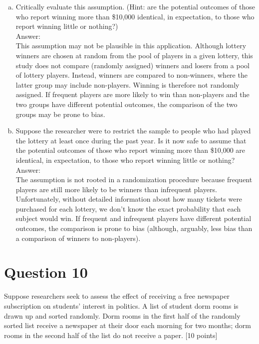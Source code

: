 \documentclass[11pt,notitlepage]{article}		%
\begin{document}
\begin{enumerate}[a)]
\item Critically evaluate this assumption. (Hint: are the potential outcomes of those who report winning more than \$10,000 identical, in expectation, to those who report winning little or nothing?)  \\
Answer:\\
This assumption may not be plausible in this application.  Although lottery winners are chosen at random from the pool of players in a given lottery, this study does not compare (randomly assigned) winners and losers from a pool of lottery players.  Instead, winners are compared to non-winners, where the latter group may include non-players.  Winning is therefore not randomly assigned.  If frequent players are more likely to win than non-players and the two groups have different potential outcomes, the comparison of the two groups may be prone to bias.
\item Suppose the researcher were to restrict the sample to people who had played the lottery at least once during the past year.  Is it now safe to assume that the potential outcomes of those who report winning more than \$10,000 are identical, in expectation, to those who report winning little or nothing?  \\
Answer:\\
The assumption is not rooted in a randomization procedure because frequent players are still more likely to be winners than infrequent players.  Unfortunately, without detailed information about how many tickets were purchased for each lottery, we don't know the exact probability that each subject would win.  If frequent and infrequent players have different potential outcomes, the comparison is prone to bias (although, arguably, less bias than a comparison of winners to non-players).

\end{enumerate}



\section*{Question 10}
Suppose researchers seek to assess the effect of receiving a free newspaper subscription on students' interest in politics.  A list of student dorm rooms is drawn up and sorted randomly. Dorm rooms in the first half of the randomly sorted list receive a newspaper at their door each morning for two months; dorm rooms in the second half of the list do not receive a paper. [10 points]
\end{document}
